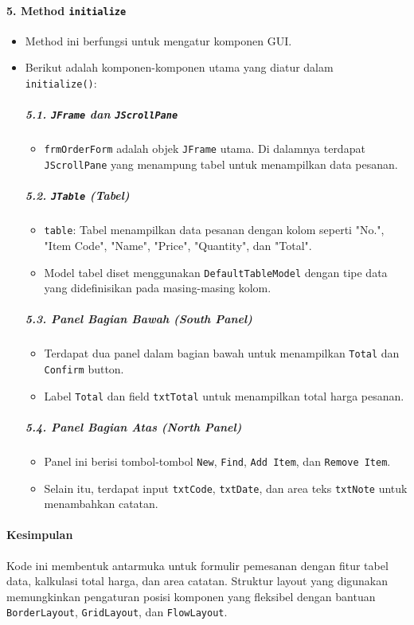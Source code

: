 \paragraph{5. Method \texttt{initialize}}
\begin{itemize}
	\item Method ini berfungsi untuk mengatur komponen GUI.
	\item Berikut adalah komponen-komponen utama yang diatur dalam \texttt{initialize()}:
	
	\subparagraph{5.1. \texttt{JFrame} dan \texttt{JScrollPane}}
	\begin{itemize}
		\item \texttt{frmOrderForm} adalah objek \texttt{JFrame} utama. Di dalamnya terdapat \texttt{JScrollPane} yang menampung tabel untuk menampilkan data pesanan.
	\end{itemize}
	
	\subparagraph{5.2. \texttt{JTable} (Tabel)}
	\begin{itemize}
		\item \texttt{table}: Tabel menampilkan data pesanan dengan kolom seperti "No.", "Item Code", "Name", "Price", "Quantity", dan "Total".
		\item Model tabel diset menggunakan \texttt{DefaultTableModel} dengan tipe data yang didefinisikan pada masing-masing kolom.
	\end{itemize}
	
	\subparagraph{5.3. Panel Bagian Bawah (South Panel)}
	\begin{itemize}
		\item Terdapat dua panel dalam bagian bawah untuk menampilkan \texttt{Total} dan \texttt{Confirm} button.
		\item Label \texttt{Total} dan field \texttt{txtTotal} untuk menampilkan total harga pesanan.
	\end{itemize}
	
	\subparagraph{5.4. Panel Bagian Atas (North Panel)}
	\begin{itemize}
		\item Panel ini berisi tombol-tombol \texttt{New}, \texttt{Find}, \texttt{Add Item}, dan \texttt{Remove Item}.
		\item Selain itu, terdapat input \texttt{txtCode}, \texttt{txtDate}, dan area teks \texttt{txtNote} untuk menambahkan catatan.
	\end{itemize}
\end{itemize}

\paragraph{Kesimpulan}
Kode ini membentuk antarmuka untuk formulir pemesanan dengan fitur tabel data, kalkulasi total harga, dan area catatan. Struktur layout yang digunakan memungkinkan pengaturan posisi komponen yang fleksibel dengan bantuan \texttt{BorderLayout}, \texttt{GridLayout}, dan \texttt{FlowLayout}.


